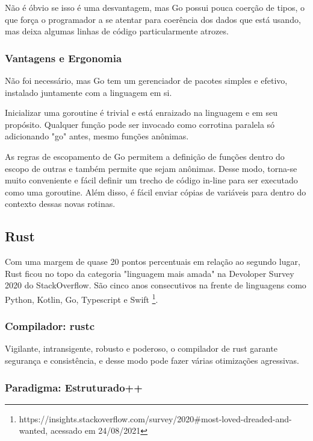 \documentclass{article}
\begin{document}
Não é óbvio se isso é uma desvantagem, mas Go possui pouca coerção de tipos, o que força o programador a se atentar para coerência dos dados que está usando, mas deixa algumas linhas de código particularmente atrozes.

\subsubsection{Vantagens e Ergonomia}
\label{sssec:go vantagens}

Não foi necessário, mas Go tem um gerenciador de pacotes simples e efetivo, instalado juntamente com a linguagem em si.

Inicializar uma goroutine é trivial e está enraizado na linguagem e em seu propósito. Qualquer função pode ser invocado como corrotina paralela só adicionando "go" antes, mesmo funções anônimas.

As regras de escopamento de Go permitem a definição de funções dentro do escopo de outras e também permite que sejam anônimas. Desse modo, torna-se muito conveniente e fácil definir um trecho de código in-line para ser executado como uma goroutine. Além disso, é fácil enviar cópias de variáveis para dentro do contexto dessas novas rotinas.


\subsection{Rust}
\label{ssec:rust}

Com uma margem de quase 20 pontos percentuais em relação ao segundo lugar, Rust ficou no topo da categoria "linguagem mais amada" na Devoloper Survey 2020 do StackOverflow. São cinco anos consecutivos na frente de linguagens como Python, Kotlin, Go, Typescript e Swift \footnote{https://insights.stackoverflow.com/survey/2020\#most-loved-dreaded-and-wanted, acessado em 24/08/2021}.

\subsubsection{Compilador: rustc}
\label{sssec:rust compilador}

Vigilante, intransigente, robusto e poderoso, o compilador de rust garante segurança e consistência, e desse modo pode fazer várias otimizações agressivas.

\subsubsection{Paradigma: Estruturado++}
\label{sssec:rust paradigma}
\end{document}
